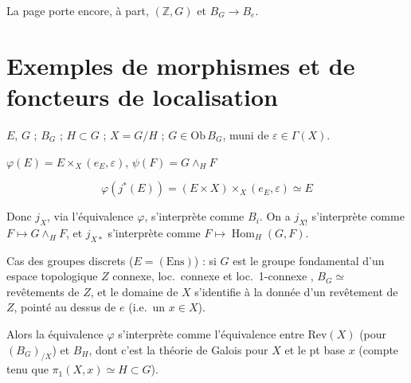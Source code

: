 \documentclass[11pt,a4paper]{article}
\begin{document}
La page porte encore, à part, $(\mathbb{Z}, G)$ et $B_{G} \to B_{e}$.

\section*{Exemples de morphismes et de foncteurs de localisation}

$E$, $G$ ; $B_{G}$ ; $H \subset G$ ; $X = G/H$ ; $G \in \mathrm{Ob}\,B_{G}$, muni
de $\varepsilon \in \Gamma(X)$.



$\varphi(E) = E \times_{X} (e_{E}, \varepsilon)$,
$\psi(F) = G \wedge_{H} F$

\[
\varphi(j^{*}(E)) = (E \times X) \times_{X} (e_{E}, \varepsilon) \simeq E
\]


Donc $j_{X}$, via l'équivalence $\varphi$, s'interprète comme $B_{i}$. On a
$j_{X!}$ s'interprète comme $F \mapsto G \wedge_{H} F$, et $j_{X*}$ s'interprète
comme $F \mapsto \operatorname{Hom}_{H}(G, F)$.


Cas des groupes discrets ($E = (\mathrm{Ens})$) : si $G$ est le groupe fondamental
d'un espace topologique $Z$ connexe, loc.\ connexe et loc.\ 1-connexe
, $B_{G} \simeq$ revêtements de $Z$, et le domaine
de $X$ s'identifie à la donnée d'un revêtement \struck{\ill{}} de $Z$, pointé au
dessus de $e$ (i.e.\ un $x \in X$).


Alors la \struck{\ill{}} équivalence $\varphi$ \struck{\ill{}} s'interprète comme
l'équivalence entre $\mathrm{Rev}(X)$ (pour $(B_{G})_{/X}$) et
 $B_{H}$, dont c'est la théorie de Galois pour $X$ et le pt
base $x$ (compte tenu que $\pi_{1}(X, x) \simeq H \subset G$).
\end{document}
